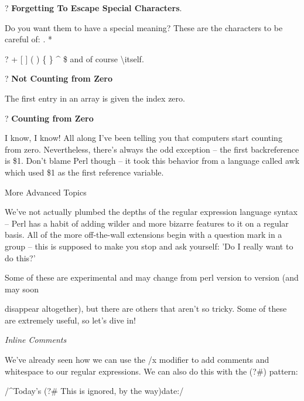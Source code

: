 \documentclass[a4paper,11pt]{book}
\begin{document}
\noindent 

\noindent 

\noindent ? \textbf{Forgetting To Escape Special Characters}.

\noindent Do you want them to have a special meaning? These are the characters to be careful of: . *

\noindent ? + [ ] ( ) \{ \} \^{} \$ \textbar  and of course \textbackslash  itself.

\noindent ? \textbf{Not Counting from Zero}

\noindent The first entry in an array is given the index zero.

\noindent 

\noindent ? \textbf{Counting from Zero}

\noindent I know, I know! All along I've been telling you that computers start counting from zero. Nevertheless, there's always the odd exception -- the first backreference is \$1. Don't blame Perl though -- it took this behavior from a language called awk which used \$1 as the first reference variable.

\noindent 

\noindent 

\noindent More Advanced Topics

\noindent We've not actually plumbed the depths of the regular expression language syntax -- Perl has a habit of adding wilder and more bizarre features to it on a regular basis. All of the more off-the-wall extensions begin with a question mark in a group -- this is supposed to make you stop and ask yourself: 'Do I really want to do this?'

\noindent 

\noindent Some of these are experimental  and  may  change  from  perl  version  to  version  (and may soon

\noindent disappear altogether),  but there  are  others  that  aren't  so  tricky.  Some of  these  are extremely  useful,  so let's  dive in!

\noindent 

\noindent \textit{Inline Comments}

\noindent We've already seen how we can use the /x modifier to add comments and whitespace to our regular expressions. We can also do this with the (?\#) pattern:

\noindent 

\noindent /\^{}Today's (?\# This is ignored, by the way)date:/

\noindent 
\end{document}

